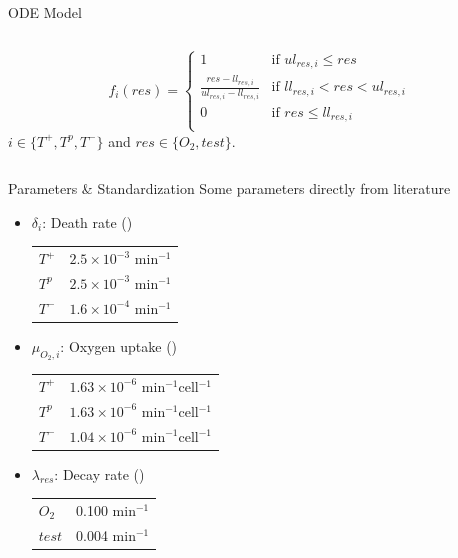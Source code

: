 \documentclass[aspectratio=169,9pt]{beamer}
\begin{document}
\begin{frame}{ODE Model}
\begin{columns}
\begin{column}{0.6\textwidth}
      \begin{equation}
        f_i(res) = \begin{cases}
          1 &\text{if } ul_{res,i} \leq res\\
          \frac{res-ll_{res,i}}{ul_{res,i}-ll_{res,i}} &\text{if } ll_{res,i} < res < ul_{res,i}\\
          0 &\text{if } res \leq ll_{res,i}\\
        \end{cases}
        \label{freseq}
      \end{equation}
      $i \in \{T^+,T^p,T^-\}$ and $res \in \{O_2,test\}$.
    \end{column}
  \end{columns}
\end{frame}

\begin{frame}{Parameters \& Standardization}
  Some parameters directly from literature
  \begin{itemize}
    \item $\delta_i$: Death rate (\cite{Jain})\\
    \begin{tabular}{ll}
      $T^+$ & $2.5 \times 10^{-3}$ min$^{-1}$\\
      $T^p$ & $2.5 \times 10^{-3}$ min$^{-1}$\\
      $T^-$ & $1.6 \times 10^{-4}$ min$^{-1}$\\
    \end{tabular}
    \item $\mu_{O_2,i}$: Oxygen uptake (\cite{HailJr})\\
    \begin{tabular}{ll}
      $T^+$ & $1.63 \times 10^{-6}$ min$^{-1}$cell$^{-1}$\\
      $T^p$ & $1.63 \times 10^{-6}$ min$^{-1}$cell$^{-1}$\\
      $T^-$ & $1.04 \times 10^{-6}$ min$^{-1}$cell$^{-1}$\\
    \end{tabular}
    \item $\lambda_{res}$: Decay rate (\cite{Jain})\\
    \begin{tabular}{ll}
      $O_2$ & 0.100 min$^{-1}$\\
      $test$ & 0.004 min$^{-1}$\\
    \end{tabular}
  \end{itemize}
\end{frame}
\end{document}
